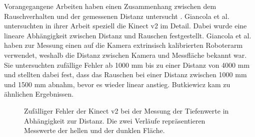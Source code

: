 \documentclass[thesis.tex]{subfiles}
\begin{document}
Vorangegangene Arbeiten haben einen Zusammenhang zwischen dem Rauschverhalten und der gemessenen Distanz untersucht \cite{bib:Giancola2018}\cite{bib:Keller2015}\cite{bib:Butkiewicz2014}. Giancola et al. \cite{bib:Giancola2018} untersuchten in ihrer Arbeit speziell die Kinect v2 im Detail. Dabei wurde eine lineare Abhängigkeit zwischen Distanz und Rauschen festgestellt. Giancola et al. \cite{bib:Giancola2018} haben zur Messung einen auf die Kamera extrinsisch kalibrierten Roboterarm verwendet, weshalb die Distanz zwischen Kamera und Messfläche bekannt war. Sie untersuchten zufällige Fehler ab 1000 mm bis zu einer Distanz von 4000 mm und stellten dabei fest, dass das Rauschen bei einer Distanz zwischen 1000 mm und 1500 mm abnahm, bevor es wieder linear anstieg. Butkiewicz \cite{bib:Butkiewicz2014} kam zu ähnlichen Ergebnissen.

\begin{figure}[h!]
\centering
{}
\caption{Zufälliger Fehler der Kinect v2 bei der Messung der Tiefenwerte in Abhängigkeit zur Distanz. Die zwei Verläufe repräsentieren Messwerte der hellen und der dunklen Fläche.}
\label{fig:noise_distance_ratio_Kinect_v2}
\end{figure}
\end{document}
